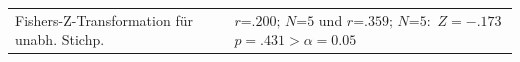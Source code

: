 \documentclass[a4paper,11pt]{article}%
\renewcommand{\\}{\vspace*{0.5\baselineskip} \newline}
\begin{document}
\begin{table}[H]
\begin{tabularx}{\textwidth}{p{3cm} | p{3.5cm} | p{3.5cm}}
		\hline 		

		Fishers-Z-Transformation für unabh. Stichp.
		&
		&  $\textit{r=.200; N=5}$ und $\textit{r=.359; N=5} :$\newline \newline
		$Z=-.173$\newline
		$p=.431>\alpha=0.05$ \\
		
		\hline 	
	\end{tabularx}
\end{table}		


%



%
%
%
%
%
%	




\end{document}
